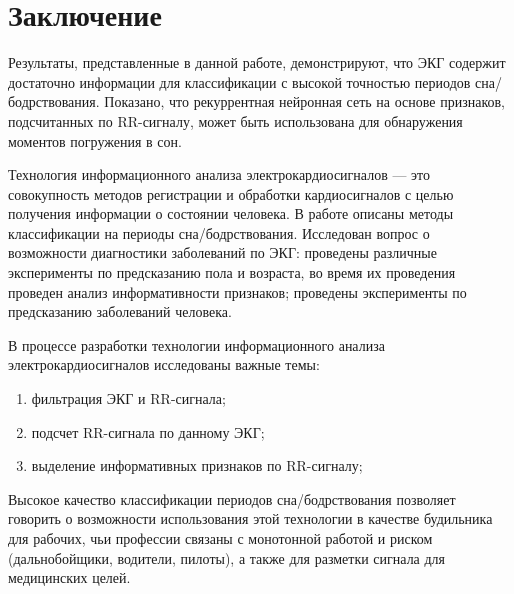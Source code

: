 \chapter{Заключение}
Результаты, представленные в данной работе, демонстрируют, что ЭКГ содержит достаточно информации для классификации с высокой точностью периодов сна/бодрствования. Показано, что рекуррентная нейронная сеть на основе признаков, подсчитанных по RR-сигналу, может быть использована для обнаружения моментов погружения в сон.

Технология информационного анализа электрокардиосигналов — это совокупность методов регистрации и обработки кардиосигналов с целью получения информации о состоянии человека. В работе описаны методы классификации на периоды сна/бодрствования. Исследован вопрос о возможности диагностики заболеваний по ЭКГ:
проведены различные эксперименты по предсказанию пола и возраста, во время их проведения проведен анализ информативности признаков; проведены эксперименты по предсказанию заболеваний человека.

В процессе разработки технологии информационного анализа электрокардиосигналов исследованы важные темы:
\begin{enumerate}
	\item фильтрация ЭКГ и RR-сигнала;
	\item подсчет RR-сигнала по данному ЭКГ;
	\item выделение информативных признаков по RR-сигналу;
\end{enumerate}

Высокое качество классификации периодов сна/бодрствования позволяет говорить о возможности использования этой технологии в качестве будильника для рабочих, чьи профессии связаны с монотонной работой и риском (дальнобойщики, водители, пилоты), а также для разметки сигнала для медицинских целей.